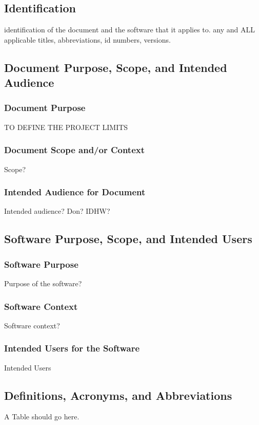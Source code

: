 \documentclass[letterpaper]{article}
\begin{document}
\subsection{\bfseries{Identification}}
identification of the document and the software that it applies to. any and ALL applicable titles, abbreviations, id numbers, versions.

\subsection{\bfseries{Document Purpose, Scope, and Intended Audience}}
\subsubsection{Document Purpose}
TO DEFINE THE PROJECT LIMITS
\subsubsection{Document Scope and/or Context}
Scope?
\subsubsection{Intended Audience for Document}
Intended audience? Don? IDHW?

\subsection{\bfseries{Software Purpose, Scope, and Intended Users}}
\subsubsection{Software Purpose}
Purpose of the software?
\subsubsection{Software Context}
Software context?
\subsubsection{Intended Users for the Software}
Intended Users


\subsection{\bfseries{Definitions, Acronyms, and Abbreviations}}
A Table should go here.
\end{document}
